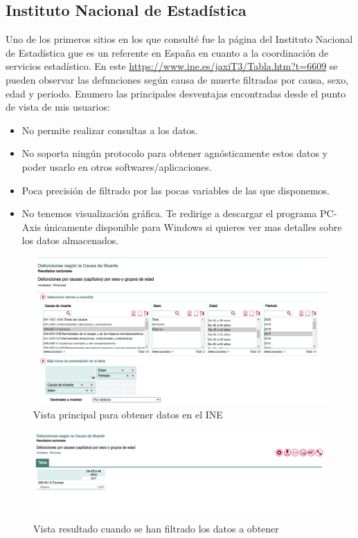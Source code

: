 \subsection{Instituto Nacional de Estadística}
Uno de los primeros sitios en los que consulté fue la página del Instituto Nacional de Estadística \href{https://www.ine.es/index.htm} que es un referente en España en cuanto a la coordinación de servicios estadístico.
En este \href{enlace}{https://www.ine.es/jaxiT3/Tabla.htm?t=6609} se pueden observar las defunciones según causa de muerte filtradas por causa, sexo, edad y periodo. 
Enumero las principales desventajas encontradas desde el punto de vista de mis usuarios:
\begin{itemize}
    \item No permite realizar consultas a los datos.
    \item No soporta ningún protocolo para obtener agnósticamente estos datos y poder usarlo en otros softwares/aplicaciones.
    \item Poca precisión de filtrado por las pocas variables de las que disponemos.
    \item No tenemos visualización gráfica. Te redirige a descargar el programa PC-Axis únicamente disponible para Windows si quieres ver mas detalles sobre los datos almacenados.
\end{itemize}
\FloatBarrier
\begin{figure}[]
	\centering
	\includegraphics[scale=0.5]{doc/logos/imgs/ine1.png}
	\caption{  Vista principal para obtener datos en el INE }
    \label{fig:worst_f_value}
\end{figure}

\begin{figure}[]
	\centering
	\includegraphics[scale=0.5]{doc/logos/imgs/ine2.png}
	\caption{ Vista resultado cuando se han filtrado los datos a obtener }
    \label{fig:worst_f_value}
\end{figure}
\FloatBarrier

